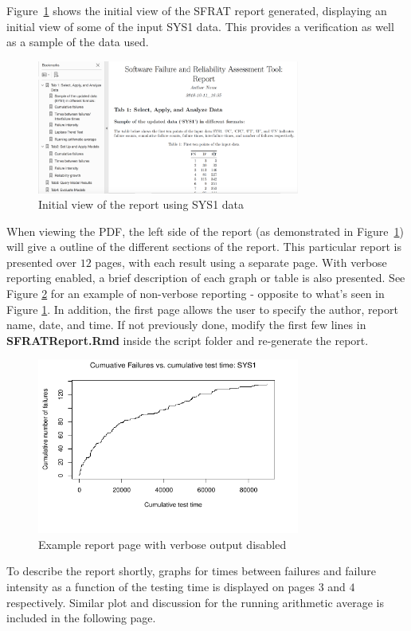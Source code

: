 \documentclass[conference]{IEEEtran}
\begin{document}
Figure~\ref{fig:SYS1Report} shows the initial view of the SFRAT report generated, displaying an initial view of some of the input SYS1 data. This provides a verification as well as a sample of the data used.
\begin{figure}[!ht]
\centering
\includegraphics[width=3.4in]{Figures/SYS1Report}
\caption{Initial view of the report using SYS1 data}
\label{fig:SYS1Report}
\end{figure}

When viewing the PDF, the left side of the report (as demonstrated in Figure~\ref{fig:SYS1Report}) will give a outline of the different sections of the report. This particular report is presented over $12$ pages, with each result using a separate page. With verbose reporting enabled, a brief description of each graph or table is also presented. See Figure \ref{fig:nonverbose} for an example of non-verbose reporting - opposite to what's seen in Figure \ref{fig:SYS1Report}. In addition, the first page allows the user to specify the author, report name, date, and time. If not previously done, modify the first few lines in \textbf{SFRATReport.Rmd} inside the script folder and re-generate the report.

\begin{figure}[!ht]
\centering
\includegraphics[width=3.4in]{Figures/nonverbose}
\caption{Example report page with verbose output disabled}
\label{fig:nonverbose}
\end{figure}

To describe the report shortly, graphs for times between failures and failure intensity as a function of the testing time is displayed on pages $3$ and $4$ respectively. Similar plot and discussion for the running arithmetic average is included in the following page.
\end{document}
